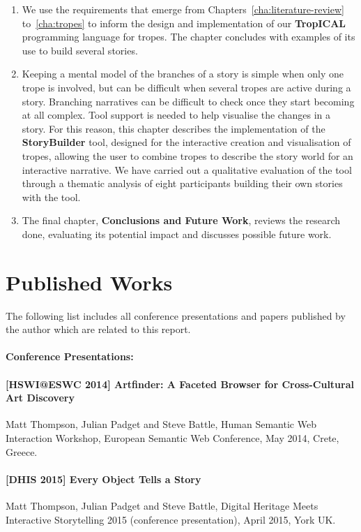 \documentclass[11pt]{report}
\begin{document}
\begin{enumerate}[{Chapter} 1:]
{    2015]} paper.
\item We use the requirements that emerge from Chapters~\ref{cha:literature-review}
  to~\ref{cha:tropes} to inform the design and implementation of our \textbf{TropICAL} programming
  language for tropes. The chapter concludes with examples of its use to build several stories.
\item
  Keeping a mental model of the branches of a story is simple when only one
  trope is involved, but can be difficult when several tropes are active during a story.
  Branching narratives can be difficult to check once they start becoming at all
  complex. Tool support is needed to help visualise the changes in a
  story. For
  this reason, this chapter describes the implementation of the \textbf{StoryBuilder} tool,
  designed for the interactive creation and visualisation of tropes, allowing
  the user to combine tropes to describe the story world for an interactive
  narrative. We have carried out a qualitative evaluation of the tool
  through a thematic analysis of eight participants building their own stories
  with the tool.
\item The final chapter, \textbf{Conclusions and Future Work}, reviews the
  research done, evaluating its potential impact and discusses possible future work.
\end{enumerate}


\section{Published Works}
\label{sec:papers}

  The following list includes all conference presentations and papers published by the author which are related to this report.

  \paragraph{Conference Presentations:}
  \paragraph{[HSWI@ESWC 2014] Artfinder: A Faceted Browser for Cross-Cultural Art Discovery} Matt Thompson, Julian Padget and Steve Battle, Human Semantic Web Interaction Workshop, European Semantic Web Conference, May 2014, Crete, Greece.\label{pub:hswi}
  \paragraph{[DHIS 2015] Every Object Tells a Story} Matt Thompson, Julian Padget and Steve Battle, Digital Heritage Meets Interactive Storytelling 2015 (conference presentation), April 2015, York UK.\label{pub:dhis}
\end{document}
